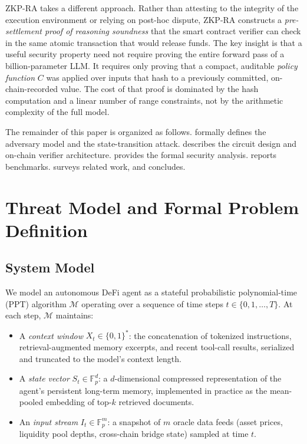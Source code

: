 \documentclass[final,5p,times,twocolumn]{elsarticle}
\theoremstyle{plain}
\theoremstyle{definition}
\theoremstyle{remark}
\newcommand{\F}{\mathbb{F}}
\begin{document}
ZKP-RA takes a different approach. Rather than attesting to the integrity of
the execution environment or relying on post-hoc dispute, ZKP-RA constructs a
\emph{pre-settlement proof of reasoning soundness} that the smart contract
verifier can check in the same atomic transaction that would release funds.
The key insight is that a useful security property need not require proving
the entire forward pass of a billion-parameter LLM. It requires only proving
that a compact, auditable \emph{policy function} $C$ was applied over inputs
that hash to a previously committed, on-chain-recorded value. The cost of
that proof is dominated by the hash computation and a linear number of range
constraints, not by the arithmetic complexity of the full model.

The remainder of this paper is organized as follows.  formally
defines the adversary model and the state-transition attack. 
describes the circuit design and on-chain verifier architecture. 
provides the formal security analysis.  reports benchmarks.
 surveys related work, and  concludes.

\section{Threat Model and Formal Problem Definition}
\label{sec:threat}

\subsection{System Model}
\label{sec:system}

We model an autonomous DeFi agent as a stateful probabilistic polynomial-time
(PPT) algorithm $\mathcal{M}$ operating over a sequence of time steps
$t \in \{0,1,\ldots,T\}$. At each step, $\mathcal{M}$ maintains:

\begin{itemize}
  \item A \emph{context window} $X_t \in \{0,1\}^{*}$: the concatenation of
        tokenized instructions, retrieval-augmented memory excerpts, and recent
        tool-call results, serialized and truncated to the model's context length.
  \item A \emph{state vector} $S_t \in \F_p^{d}$: a $d$-dimensional compressed
        representation of the agent's persistent long-term memory, implemented in
        practice as the mean-pooled embedding of top-$k$ retrieved documents.
  \item An \emph{input stream} $I_t \in \F_p^{m}$: a snapshot of $m$ oracle
        data feeds (asset prices, liquidity pool depths, cross-chain bridge state)
        sampled at time $t$.
\end{itemize}
\end{document}
